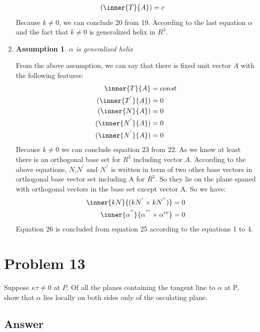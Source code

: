 \documentclass[
	12pt, %
]{fphw}
\theoremstyle{plain}
\newtheorem{assumption}{Assumption}
\begin{document}
\begin{enumerate}
\begin{align}
          (\inner{T}{A}) & = c 
      \end{align}  
      Because $k \neq 0 $, we can conclude 20 from 19. According to the last equation $\alpha$ and the fact that $k \neq 0  $ is generalized helix in $R^{3}$.
     \item 
     \begin{assumption}
          $\alpha$ is generalized helix
     \end{assumption} 
     From the above assumption, we can say that there is fixed unit vector $A$ with the following features:
     \begin{align}
          \inner{T}{A} & = const\\
          (\inner{T^{'}}{A}) & = 0 \\
          (\inner{N}{A}) & = 0 \\
          (\inner{N^{'}}{A}) & = 0 \\
          (\inner{N^{'}}{A}) & = 0
      \end{align}
      Because $k \neq 0$ we can conclude equation 23 from 22. As we know at least there is an orthogonal base set for $R^{3}$ including vector $A$. According to the above equations, $N$,$N^{'}$ and $N^{''}$ is written in term of two other base vectors in orthogonal base vector set including A for $R^{3}$. So they lie on the plane spaned with orthogonal vectors in the base set except vector A. So we have:
      \begin{align}
          \inner{kN}{(kN^{'} \times kN^{''})} & = 0 \\
          \inner{\alpha^{''}}{\alpha^{'''}\times\alpha^{iv}} & = 0 
     \end{align}
      Equation 26 is concluded from equation 25 according to the equations 1 to 4.
\end{enumerate}

\section*{Problem 13}
\begin{problem}
     Suppose $\kappa\tau \neq 0$ at $P$. Of all the planes containing the tangent line to $\alpha$ at P, show that $\alpha$ lies locally on both sides only of the osculating plane.
\end{problem}
\subsection*{Answer}
\end{document}
